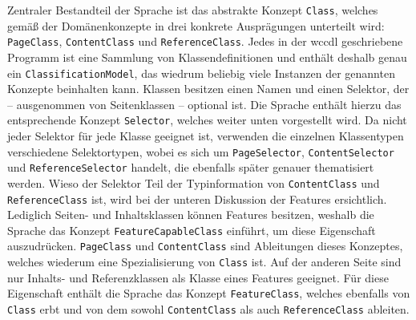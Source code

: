     Zentraler Bestandteil der Sprache ist das abstrakte Konzept \texttt{Class},
    welches gemäß der Domänenkonzepte in drei konkrete Ausprägungen unterteilt wird:
    \texttt{PageClass}, \texttt{ContentClass} und \texttt{ReferenceClass}.
    Jedes in der \gls{wccdl} geschriebene Programm ist eine Sammlung
    von Klassendefinitionen und enthält deshalb genau ein \texttt{ClassificationModel},
    das wiedrum beliebig viele Instanzen der genannten Konzepte beinhalten kann.
    Klassen besitzen einen Namen und einen Selektor,
    der -- ausgenommen von Seitenklassen -- optional ist.
    Die Sprache enthält hierzu das entsprechende Konzept \texttt{Selector},
    welches weiter unten vorgestellt wird.
    Da nicht jeder Selektor für jede Klasse geeignet ist,
    verwenden die einzelnen Klassentypen verschiedene Selektortypen,
    wobei es sich um \texttt{PageSelector}, \texttt{ContentSelector}
    und \texttt{ReferenceSelector} handelt,
    die ebenfalls später genauer thematisiert werden.
    Wieso der Selektor Teil der Typinformation von \texttt{ContentClass}
    und \texttt{ReferenceClass} ist,
    wird bei der unteren Diskussion der Features ersichtlich.
    Lediglich Seiten- und Inhaltsklassen können Features besitzen,
    weshalb die Sprache das Konzept \texttt{FeatureCapableClass} einführt,
    um diese Eigenschaft auszudrücken.
    \texttt{PageClass} und \texttt{ContentClass} sind
    Ableitungen dieses Konzeptes, welches
    wiederum eine Spezialisierung von \texttt{Class} ist.
    Auf der anderen Seite sind nur Inhalts- und Referenzklassen als Klasse eines Features geeignet.
    Für diese Eigenschaft enthält die Sprache das Konzept \texttt{FeatureClass},
    welches ebenfalls von \texttt{Class} erbt und
    von dem sowohl \texttt{ContentClass} als auch \texttt{ReferenceClass} ableiten.

